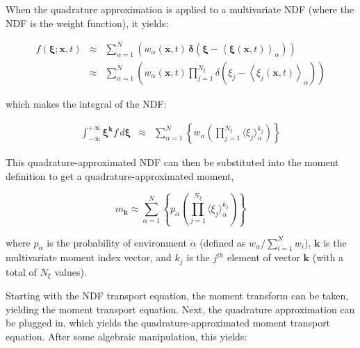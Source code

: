 When the quadrature approximation is applied to a multivariate NDF (where the NDF is the weight function), it yields:

\begin{eqnarray}\label{eq:quadrature-approximated-ndf}
f(\boldsymbol{\xi};\mathbf{x},t) 
& \approx & {\displaystyle \sum_{\alpha=1}^{N}\left(w_{\alpha}(\boldsymbol{x},t){\displaystyle \,\boldsymbol{\delta}\left(\boldsymbol{\xi}-\left\langle \boldsymbol{\xi}(\boldsymbol{x},t)\right\rangle _{\alpha}\right)}\right)} \nonumber \\
& \approx & {\displaystyle \sum_{\alpha=1}^{N}\left(w_{\alpha}(\boldsymbol{x},t){\displaystyle \prod_{j=1}^{N_{\xi}}\delta\left(\xi_{j}-\left\langle \xi_{j}(\boldsymbol{x},t)\right\rangle _{\alpha}\right)}\right)}
\end{eqnarray}

\noindent which makes the integral of the NDF:

\begin{eqnarray}\label{eq:quadrature-approximated-ndf-integral}
{\displaystyle \int_{-\infty}^{+\infty}}\boldsymbol{\xi}^{\boldsymbol{k}}f\, d\boldsymbol{\xi}
&\approx&{\displaystyle \sum_{\alpha=1}^{N}\left\{ w_{\alpha}\left(\prod_{j=1}^{N_{\xi}}\langle\xi_{j}\rangle_{\alpha}^{k_{j}}\right)\right\} }
\end{eqnarray}

This quadrature-approximated NDF can then be substituted into the moment definition to get a quadrature-approximated moment,

\begin{equation}\label{eq:quadrature-approximated-moment}
m_{\boldsymbol{k}}\approx\sum_{\alpha=1}^{N}\left\{ p_{\alpha}\left(\prod_{j=1}^{N_{\xi}}\langle\xi_{j}\rangle_{\alpha}^{k_{j}}\right)\right\} 
\end{equation}

\noindent where $p_{\alpha}$ is the probability of environment $\alpha$ (defined as $w_{\alpha} / \sum_{i=1}^{N} w_{i} $), $\boldsymbol{k}$ is the multivariate moment index vector, and $k_{j}$ is the $j^{th}$ element of vector $\boldsymbol{k}$ (with a total of $N_{\xi}$ values).

Starting with the NDF transport equation, the moment transform can be taken, yielding the moment transport equation. Next, the quadrature approximation can be plugged in, which yields the quadrature-approximated moment transport equation.  After some algebraic manipulation, this yields:

